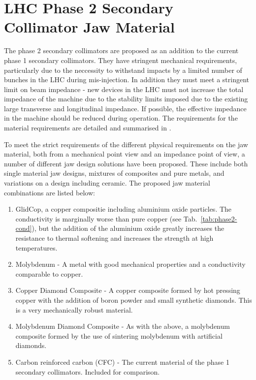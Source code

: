 \section{LHC Phase 2 Secondary Collimator Jaw Material}
\label{sec:phase-2-col-mat}

The phase 2 secondary collimators are proposed as an addition to the current phase 1 secondary collimators. They have stringent mechanical requirements, particularly due to the neccessity to withstand impacts by a limited number of bunches in the LHC during mis-injection. In addition they must meet a stringent limit on beam impedance - new devices in the LHC must not increase the total impedance of the machine due to the stability limits imposed due to the existing large transverse and longitudinal impedance. If possible, the effective impedance in the machine should be reduced during operation. The requirements for the material requirements are detailed and summarised in \cite{Bertarelli:Mat}.

To meet the strict requirements of the different physical requirements on the jaw material, both from a mechanical point view and an impedance point of view, a number of different jaw design solutions have been proposed. These include both single material jaw designs, mixtures of composites and pure metals, and variations on a design including ceramic. The proposed jaw material combinations are listed below:

\begin{enumerate}
\item{GlidCop, a copper compositie including aluminium oxide particles. The conductivity is marginally worse than pure copper (see Tab.~\ref{tab:phase2-cond}), but the addition of the aluminium oxide greatly increases the resistance to thermal softening and increases the strength at high temperatures.}
\item{Molybdenum - A metal with good mechanical properties and a conductivity comparable to copper.}
\item{Copper Diamond Composite - A copper composite formed by hot pressing copper with the addition of boron powder and small synthetic diamonds. This is a very mechanically robust material.}
\item{Molybdenum Diamond Composite - As with the above, a molybdenum composite formed by the use of sintering molybdenum with artificial diamonds.}
\item{Carbon reinforced carbon (CFC) - The current material of the phase 1 secondary collimators. Included for comparison.}
\end{enumerate}

